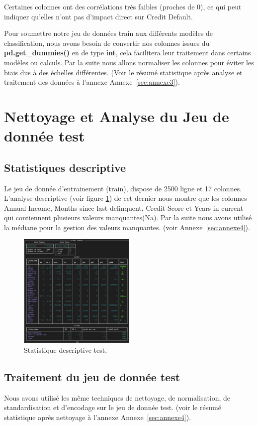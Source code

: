 Certaines colonnes ont des corrélations très faibles (proches de 0), ce qui peut indiquer qu'elles n'ont pas d'impact direct sur Credit Default.



Pour soumettre notre jeu de données train aux différents modèles de classification, nous avons besoin de convertir nos colonnes issues du \textbf{pd.get\_dummies()} en de type \textbf{int}, cela facilitera leur traitement dans certains modèles ou calculs. Par la suite nous allons normaliser les colonnes pour éviter les biais dus à des échelles différentes. (Voir le résumé statistique après analyse et traitement des données à l'annexe Annexe~\ref{sec:annexe3}).

\section{Nettoyage et Analyse du Jeu de donnée test}
\subsection{Statistiques descriptive}

Le jeu de donnée d'entrainement (train), dispose de 2500 ligne et 17 colonnes. L'analyse descriptive (voir figure \ref{fig:stats_descriptive}) de cet dernier nous montre que les colonnes Annual Income, Months since last delinquent, Credit Score et Years in current qui contiennent plusieurs valeurs manquantes(Na). Par la suite nous avons utilisé la médiane pour la gestion des valeurs manquantes. (voir Annexe~\ref{sec:annexe4}).

\begin{figure}[H]
\centering
\includegraphics[width=0.5\textwidth]{figures/fig2.png}
\caption{Statistique descriptive test.}
\label{fig:stats_descriptive}
\end{figure}


\subsection{Traitement du jeu de donnée test}

Nous avons utilisé les même techniques de nettoyage, de normalisation, de standardisation et d'encodage sur le jeu de donnée test. (voir le résumé statistique après nettoyage à l'annexe Annexe~\ref{sec:annexe4}). 

